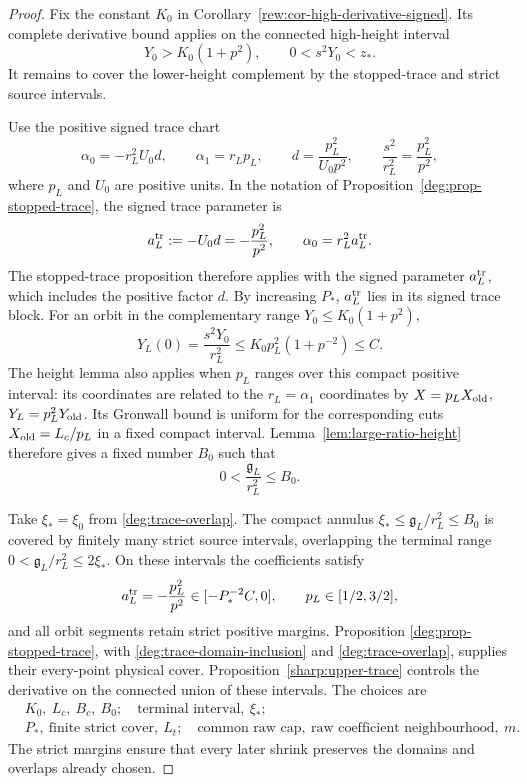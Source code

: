 \begin{proof}
Fix the constant \(K_0\) in Corollary~\ref{rew:cor-high-derivative-signed}.
Its complete derivative bound applies on the connected high-height interval
\begin{equation}
 Y_0>K_0(1+p^2),\qquad 0<s^2Y_0<z_*.
 \label{deg:large-high-height}
\end{equation}
It remains to cover the lower-height complement by the stopped-trace
and strict source intervals.

Use the positive signed trace chart
\begin{equation}
 \alpha _0=-r_L^2U_0d,\qquad
 \alpha _1=r_Lp_L,\qquad
 d=\frac{p_L^2}{U_0p^2},\qquad
 \frac{s^2}{r_L^2}=\frac{p_L^2}{p^2},
 \label{deg:large-trace-dictionary}
\end{equation}
where \(p_L\) and \(U_0\) are positive units.  In the notation of
Proposition~\ref{deg:prop-stopped-trace}, the signed trace parameter is
\[
 a_L^{\rm tr}:=-U_0d=-\frac{p_L^2}{p^2},
 \qquad \alpha _0=r_L^2a_L^{\rm tr}.
\]
The stopped-trace proposition therefore applies with the signed
parameter \(a_L^{\rm tr}\), which includes the positive factor \(d\).
By increasing \(P_*\),
\(a_L^{\rm tr}\) lies in its signed trace block. For an orbit in
the complementary range \(Y_0\le K_0(1+p^2)\),
\[
 Y_L(0)=\frac{s^2Y_0}{r_L^2}
 \le K_0p_L^2(1+p^{-2})\le C.
\]
The height lemma also applies when \(p_L\) ranges over this compact
positive interval: its coordinates are related to the
\(r_L=\alpha_1\) coordinates by
\(X=p_LX_{\rm old}\), \(Y_L=p_L^2Y_{\rm old}\).
Its Gronwall bound is uniform for the corresponding cuts
\(X_{\rm old}=L_c/p_L\) in a fixed compact interval.
Lemma~\ref{lem:large-ratio-height} therefore gives a fixed number
\(B_0\) such that
\begin{equation}
 0<\frac{\mathfrak g_L}{r_L^2}\le B_0.
 \label{deg:large-bounded-gap}
\end{equation}

Take \(\xi_*=\xi_0\) from \eqref{deg:trace-overlap}. The compact annulus
\(\xi_*\le\mathfrak g_L/r_L^2\le B_0\) is covered by finitely many
strict source intervals, overlapping the terminal range
\(0<\mathfrak g_L/r_L^2\le2\xi_*\). On these intervals the coefficients satisfy
\[
 a_L^{\rm tr}=-\frac{p_L^2}{p^2}\in[-P_*^{-2}C,0],
 \qquad p_L\in[1/2,3/2],
\]
and all orbit segments retain strict positive margins. Proposition
\ref{deg:prop-stopped-trace}, with
\eqref{deg:trace-domain-inclusion} and \eqref{deg:trace-overlap}, supplies
their every-point physical cover. Proposition~\ref{sharp:upper-trace}
controls the derivative on the connected union of these intervals. The choices are
\begin{align*}
 &K_0,\ L_c,\ B_c,\ B_0;
   \quad \text{terminal interval},\ \xi_*;\\
 &P_*,\ \text{finite strict cover},\ L_t;
   \quad \text{common raw cap},\ \text{raw coefficient neighbourhood},\ m.
\end{align*}
The strict margins ensure that every later shrink preserves the domains
and overlaps already chosen.
\end{proof}
